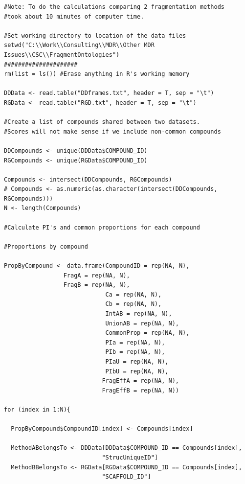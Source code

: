\documentclass[11pt,letterpaper]{article}
\begin{document}
\begin{verbatim}
#Note: To do the calculations comparing 2 fragmentation methods
#took about 10 minutes of computer time.

#Set working directory to location of the data files
setwd("C:\\Work\\Consulting\\MDR\\Other MDR Issues\\CSC\\FragmentOntologies")
#####################
rm(list = ls()) #Erase anything in R's working memory

DDData <- read.table("DDframes.txt", header = T, sep = "\t")
RGData <- read.table("RGD.txt", header = T, sep = "\t")

#Create a list of compounds shared between two datasets.
#Scores will not make sense if we include non-common compounds

DDCompounds <- unique(DDData$COMPOUND_ID)
RGCompounds <- unique(RGData$COMPOUND_ID)

Compounds <- intersect(DDCompounds, RGCompounds)
# Compounds <- as.numeric(as.character(intersect(DDCompounds, RGCompounds)))
N <- length(Compounds)

#Calculate PI's and common proportions for each compound
  
#Proportions by compound

PropByCompound <- data.frame(CompoundID = rep(NA, N),
			     FragA = rep(NA, N),
			     FragB = rep(NA, N),
                             Ca = rep(NA, N),
                             Cb = rep(NA, N),
                             IntAB = rep(NA, N),
                             UnionAB = rep(NA, N),
                             CommonProp = rep(NA, N),
                             PIa = rep(NA, N),
                             PIb = rep(NA, N),
                             PIaU = rep(NA, N),
                             PIbU = rep(NA, N),
                            FragEffA = rep(NA, N),
                            FragEffB = rep(NA, N))

for (index in 1:N){
  
  PropByCompound$CompoundID[index] <- Compounds[index]
  
  MethodABelongsTo <- DDData[DDData$COMPOUND_ID == Compounds[index],
                            "StrucUniqueID"]
  MethodBBelongsTo <- RGData[RGData$COMPOUND_ID == Compounds[index],
                            "SCAFFOLD_ID"]
							

\end{verbatim}
\end{document}
